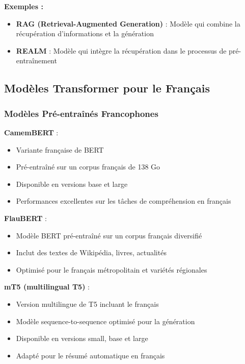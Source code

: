 \textbf{Exemples :}
\begin{itemize}
    \item \textbf{RAG (Retrieval-Augmented Generation)} : Modèle qui combine la récupération d'informations et la génération
    \item \textbf{REALM} : Modèle qui intègre la récupération dans le processus de pré-entraînement
\end{itemize}

\subsection{Modèles Transformer pour le Français}

\subsubsection{Modèles Pré-entraînés Francophones}

\textbf{CamemBERT} \cite{martin2020camembert} :
\begin{itemize}
    \item Variante française de BERT
    \item Pré-entraîné sur un corpus français de 138 Go
    \item Disponible en versions base et large
    \item Performances excellentes sur les tâches de compréhension en français
\end{itemize}

\textbf{FlauBERT} \cite{le2020flaubert} :
\begin{itemize}
    \item Modèle BERT pré-entraîné sur un corpus français diversifié
    \item Inclut des textes de Wikipédia, livres, actualités
    \item Optimisé pour le français métropolitain et variétés régionales
\end{itemize}

\textbf{mT5 (multilingual T5)} :
\begin{itemize}
    \item Version multilingue de T5 incluant le français
    \item Modèle sequence-to-sequence optimisé pour la génération
    \item Disponible en versions small, base et large
    \item Adapté pour le résumé automatique en français
\end{itemize}

